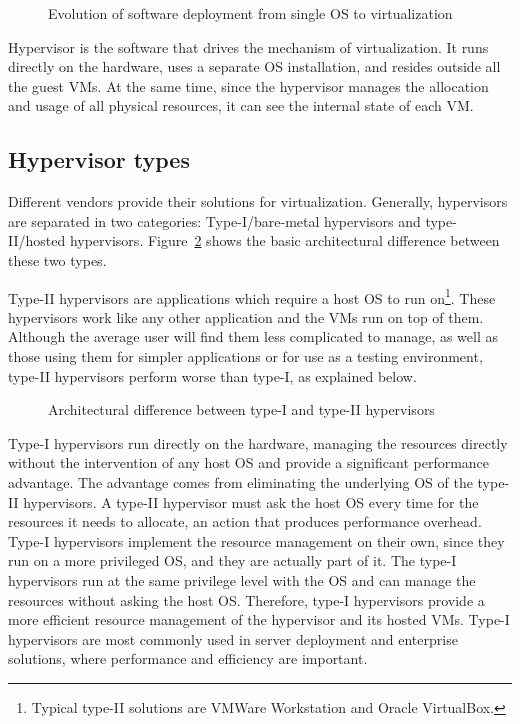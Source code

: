 \begin{figure}
	\centering
	
	\caption{Evolution of software deployment from single \ac{OS} to virtualization}
	\label{fig:tovirt}
\end{figure}

Hypervisor is the software that drives the mechanism of virtualization. It runs directly on the hardware, uses a separate \ac{OS} installation, and resides outside all the guest \ac{VM}s. At the same time, since the hypervisor manages the allocation and usage of all physical resources, it can see the internal state of each \ac{VM}. 

\subsection{Hypervisor types}\label{sub:hyptypes}
Different vendors provide their solutions for virtualization. Generally, hypervisors are separated in two categories: Type-I/bare-metal hypervisors and type-II/hosted hypervisors. Figure~\ref{fig:hyptypes} shows the basic architectural difference between these two types.

\par Type-II hypervisors are applications which require a host \ac{OS} to run on\footnote{Typical type-II solutions are VMWare Workstation and Oracle VirtualBox.}. These hypervisors work like any other application and the \acp{VM} run on top of them. Although the average user will find them less complicated to manage, as well as those using them for simpler applications or for use as a testing environment, type-II hypervisors perform worse than type-I, as explained below. 

\begin{figure}
	\centering
	
	\caption{Architectural difference between type-I and type-II hypervisors}
	\label{fig:hyptypes}
\end{figure}

\par Type-I hypervisors run directly on the hardware, managing the resources directly without the intervention of any host \ac{OS} and provide a significant performance advantage. The advantage comes from eliminating the underlying \ac{OS} of the type-II hypervisors. A type-II hypervisor must ask the host \ac{OS} every time for the resources it needs to allocate, an action that produces performance overhead. Type-I hypervisors implement the resource management on their own, since they run on a more privileged \ac{OS}, and they are actually part of it. The type-I hypervisors run at the same privilege level with the \ac{OS} and can manage the resources without asking the host \ac{OS}. Therefore, type-I hypervisors provide a more efficient resource management of the hypervisor and its hosted \acp{VM}. Type-I hypervisors are most commonly used in server deployment and enterprise solutions, where performance and efficiency are important. 

